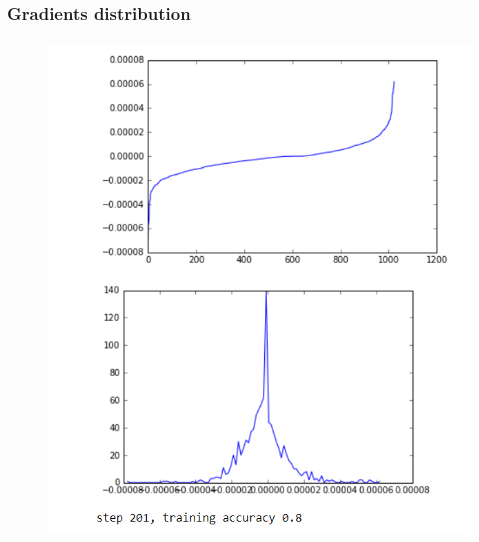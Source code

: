 \begin{frame}

    \frametitle{Gradients distribution}
    \begin{figure}
		\includegraphics[scale=0.28]{figure/200-2.PNG}
    \end{figure}
\end{frame}
